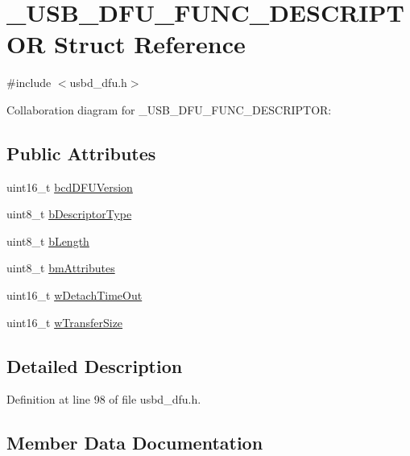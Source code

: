\hypertarget{struct__USB__DFU__FUNC__DESCRIPTOR}{}\section{\+\_\+\+U\+S\+B\+\_\+\+D\+F\+U\+\_\+\+F\+U\+N\+C\+\_\+\+D\+E\+S\+C\+R\+I\+P\+T\+OR Struct Reference}
\label{struct__USB__DFU__FUNC__DESCRIPTOR}


{\ttfamily \#include $<$usbd\+\_\+dfu.\+h$>$}



Collaboration diagram for \+\_\+\+U\+S\+B\+\_\+\+D\+F\+U\+\_\+\+F\+U\+N\+C\+\_\+\+D\+E\+S\+C\+R\+I\+P\+T\+OR\+:
\subsection*{Public Attributes}
\begin{DoxyCompactItemize}
\item 
uint16\+\_\+t \hyperlink{struct__USB__DFU__FUNC__DESCRIPTOR_acc4e2bf500911850131421896697e503}{bcd\+D\+F\+U\+Version}
\item 
uint8\+\_\+t \hyperlink{struct__USB__DFU__FUNC__DESCRIPTOR_a89748491aeed40b066125858de36f32a}{b\+Descriptor\+Type}
\item 
uint8\+\_\+t \hyperlink{struct__USB__DFU__FUNC__DESCRIPTOR_a87a03979bd723f81bb50ef42b306293e}{b\+Length}
\item 
uint8\+\_\+t \hyperlink{struct__USB__DFU__FUNC__DESCRIPTOR_a5c52598802d2f0b806b60c0b7dc7daab}{bm\+Attributes}
\item 
uint16\+\_\+t \hyperlink{struct__USB__DFU__FUNC__DESCRIPTOR_adf39c3370bc0103fa7e7fb4b2f55997f}{w\+Detach\+Time\+Out}
\item 
uint16\+\_\+t \hyperlink{struct__USB__DFU__FUNC__DESCRIPTOR_aa2d15000591e2a01b63bc46e53dde84a}{w\+Transfer\+Size}
\end{DoxyCompactItemize}


\subsection{Detailed Description}


Definition at line 98 of file usbd\+\_\+dfu.\+h.



\subsection{Member Data Documentation}
